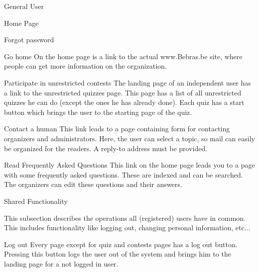 \begin{section}{General User}
\begin{subsection}{Home Page}
        \begin{subsubsection}{Forgot password}
        \end{subsubsection}

        \begin{subsubsection}{Go home}
            On the home page is a link to the actual www.Bebras.be site, where
            people can get more information on the organization.
        \end{subsubsection}

        \begin{subsubsection}{Participate in unrestricted contests}
            The landing page of an independent user has a link to the
            unrestricted quizzes page. This page has a list of all unrestricted
            quizzes he can do (except the ones he has already done). Each quiz
            has a start button which brings the user to the starting page of
            the quiz.
        \end{subsubsection}

        \begin{subsubsection}{Contact a human}
            This link leads to a page containing form for contacting organizers
            and administrators. Here, the user can select a topic, so mail can
            easily be organized for the readers. A reply-to address must be
            provided.
        \end{subsubsection}

        \begin{subsubsection}{Read Frequently Asked Questions}
            This link on the home page leads you to a page with some frequently
            asked questions. These are indexed and can be searched. The
            organizers can edit these questions and their answers.
        \end{subsubsection}

    \end{subsection}

    \begin{subsection}{Shared Functionality}

        This subsection describes the operations all (registered) users have in
        common. This includes functionality like logging out, changing personal
        information, etc...

        \begin{subsubsection}{Log out}
            Every page except for quiz and contests pages has a log out button.
            Pressing this button logs the user out of the system and brings him
            to the landing page for a not logged in user.
        \end{subsubsection}


\end{subsection}
\end{section}
